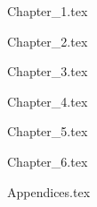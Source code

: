 \documentclass[a4paper,oneside]{book}
\begin{document}
\tableofcontents

 {Chapter_1.tex}

 {Chapter_2.tex}

 {Chapter_3.tex}

 {Chapter_4.tex}

 {Chapter_5.tex}

 {Chapter_6.tex}

%

 {Appendices.tex}
\end{document}

